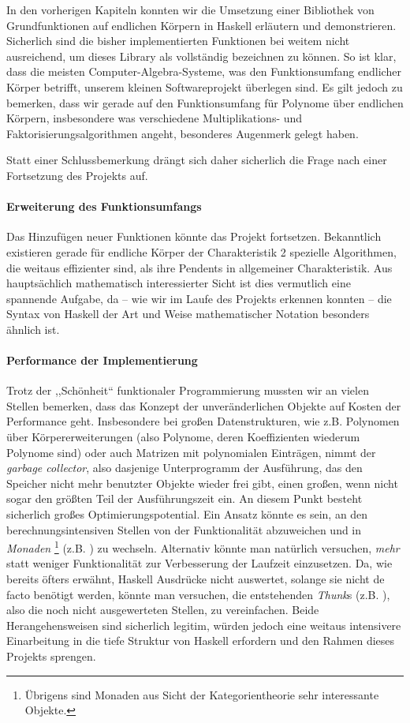 In den vorherigen Kapiteln konnten wir die Umsetzung einer Bibliothek von
Grundfunktionen auf endlichen Körpern in Haskell erläutern und demonstrieren.
Sicherlich sind die bisher implementierten Funktionen bei weitem nicht
ausreichend, um dieses Library als vollständig bezeichnen zu können. So ist
klar, dass die meisten Computer-Algebra-Systeme, was den Funktionsumfang
endlicher Körper betrifft, unserem kleinen Softwareprojekt überlegen
sind. Es gilt jedoch zu bemerken, dass wir gerade auf den Funktionsumfang für 
Polynome über endlichen Körpern, insbesondere was verschiedene
Multiplikations- und Faktorisierungsalgorithmen angeht, besonderes Augenmerk
gelegt haben.

Statt einer Schlussbemerkung drängt sich daher sicherlich die Frage nach einer
Fortsetzung des Projekts auf.

\paragraph{Erweiterung des Funktionsumfangs} Das Hinzufügen neuer
Funktionen könnte das Projekt fortsetzen. 
Bekanntlich existieren gerade für endliche Körper der Charakteristik 2 
spezielle Algorithmen, die weitaus effizienter sind, als ihre Pendents in
allgemeiner Charakteristik. Aus hauptsächlich
mathematisch interessierter Sicht ist dies vermutlich eine spannende
Aufgabe, da -- wie wir im Laufe des Projekts erkennen konnten -- die Syntax von
Haskell der Art und Weise mathematischer Notation besonders ähnlich ist.

\paragraph{Performance der Implementierung} Trotz der ,,Schönheit`` funktionaler
Programmierung mussten wir an vielen Stellen bemerken, dass das Konzept der
unveränderlichen Objekte auf Kosten der Performance geht. Insbesondere bei
großen Datenstrukturen, wie z.B. Polynomen über Körpererweiterungen (also
Polynome, deren Koeffizienten wiederum Polynome sind) oder auch Matrizen mit
polynomialen Einträgen, nimmt der \emph{garbage collector}, also dasjenige
Unterprogramm der Ausführung, das den Speicher nicht mehr benutzter Objekte
wieder frei gibt, einen großen, wenn nicht sogar den größten Teil der
Ausführungszeit ein. An diesem Punkt besteht sicherlich großes
Optimierungspotential. Ein Ansatz könnte es sein, an den berechnungsintensiven
Stellen von der Funktionalität abzuweichen und in \emph{Monaden}%
\footnote{Übrigens sind Monaden aus Sicht der Kategorientheorie sehr
interessante Objekte.}
(z.B. \autocite{haskellwiki:monaden}) zu wechseln. Alternativ könnte man
natürlich versuchen, \emph{mehr} statt weniger Funktionalität
zur Verbesserung der Laufzeit einzusetzen. Da, wie bereits öfters erwähnt,
Haskell Ausdrücke nicht auswertet, solange sie nicht de facto benötigt werden,
könnte man versuchen, die entstehenden \emph{Thunk}s 
(z.B. \autocite{haskellwiki:thunk}), also die noch nicht ausgewerteten Stellen,
zu vereinfachen. Beide Herangehensweisen sind sicherlich legitim, würden 
jedoch eine weitaus intensivere Einarbeitung in die tiefe Struktur von Haskell
erfordern und den Rahmen dieses Projekts sprengen. 

